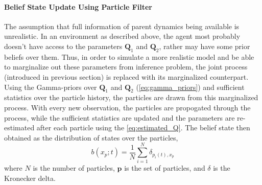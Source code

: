 \paragraph*{Belief State Update Using Particle Filter}
\label{par:bs_partFilt}
The assumption that full information of parent dynamics being available is unrealistic. In an environment as described above, the agent most probably doesn't have access to the parameters $ \textbf{Q}_1 $ and $ \textbf{Q}_2 $, rather may have some prior beliefs over them. Thus, in order to simulate a more realistic model and be able to marginalize out these parameters from inference problem, the joint process (introduced in previous section) is replaced with its marginalized counterpart. Using the Gamma-priors over $ \textbf{Q}_1 $ and $ \textbf{Q}_2 $ (\autoref{eq:gamma_priors}) and sufficient statistics over the particle history, the particles are drawn from this marginalized process. With every new observation, the particles are propogated through the process, while the sufficient statistics are updated and the parameters are re-estimated after each particle using the \autoref{eq:estimated_Q}. The belief state then obtained as the distribution of states over the particles,
\begin{equation}
b(x_p; t) = \frac{1}{N} \sum_{i=1}^{N} \delta_{p_i(t), x_p}
\end{equation}
where $ N $ is the number of particles, $ \textbf{p} $ is the set of particles, and $\delta$ is the Kronecker delta.

